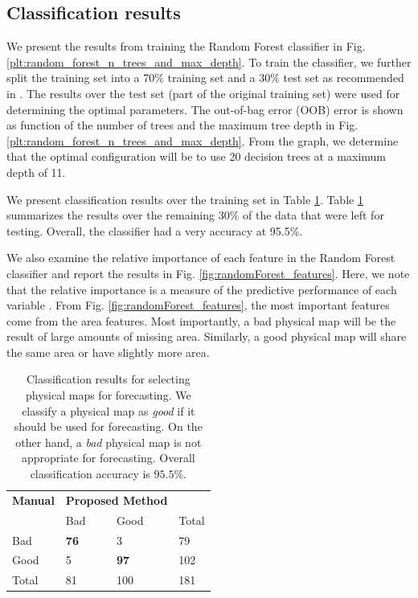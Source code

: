 \documentclass[journal]{IEEEtran}
\begin{document}

\subsection{Classification results}\label{sec:classification_results}
\color{blue}
We present the results from training the Random Forest classifier in Fig. \ref{plt:random_forest_n_trees_and_max_depth}.
To train the classifier, we further split the training set into 
   a 70\% training set and a 30\% test set as recommended in
   \cite{ESLII}.
The results over the test set (part of the original training set) 
   were used for determining the optimal parameters.
The out-of-bag error (OOB)  error is shown as function of the number of trees and the maximum tree depth
   in Fig. \ref{plt:random_forest_n_trees_and_max_depth}.
From the graph, we determine that the optimal configuration will be to use
   20 decision trees at a maximum depth of 11.


We present classification results over the training set
   in Table \ref{tab:ch5classificaiton_results_auto}.
\color{black}
Table \ref{tab:ch5classificaiton_results_auto} summarizes the results over
   the remaining 30\% of the data that were left for testing.
Overall, the classifier had a very accuracy at {\color{blue} 95.5\%}.

We also examine the relative importance of each feature in the Random Forest
   classifier and report the results in Fig. \ref{fig:randomForest_features}.
Here, we note that the relative importance is a measure of
    the predictive performance of each variable   \cite{ESLII}.
From Fig. \ref{fig:randomForest_features}, the 
    most important features come from the area features.
Most importantly, a bad physical map will be the result of large amounts
    of missing area.
Similarly, a good physical map will share the same area or have slightly more
    area.             

\begin{table}[!b]
	\color{blue}
	\caption{
		Classification results for selecting physical maps for forecasting.
		We classify a physical map as \textit{good} if it should be used for forecasting.
		On the other hand, a \textit{bad} physical map is not appropriate for forecasting.
		Overall classification accuracy is {\color{blue} $95.5\%$}.
	}
	\label{tab:ch5classificaiton_results_auto}
	\centering
	\begin{tabular}{l  p{1cm} p{0.5cm} l}
		\toprule
		\textbf{Manual}	
		&\multicolumn{2}{c}{\textbf{Proposed Method}}
		& \\
		\cmidrule{2-3}	
		& Bad & Good & Total \\
		\midrule         
		Bad      & \textbf{76}  & 3           & 79  \\
		Good     & 5            & \textbf{97} & 102 \\
		\midrule
		Total    & 81  & 100 & 181\\
		\bottomrule
	\end{tabular}
\end{table}
\end{document}
